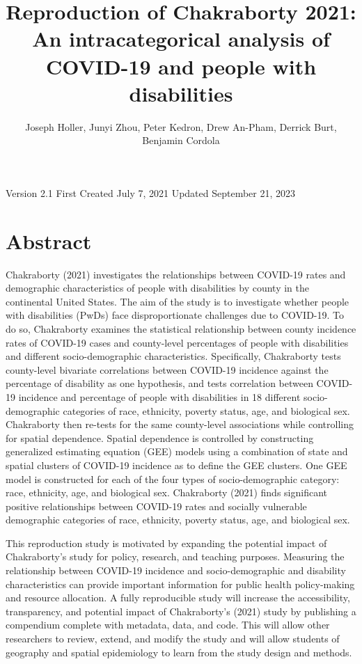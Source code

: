 \documentclass[
]{article}
\title{Reproduction of Chakraborty 2021: An intracategorical analysis of
COVID-19 and people with disabilities}
\author{Joseph Holler, Junyi Zhou, Peter Kedron, Drew An-Pham, Derrick
Burt, Benjamin Cordola}
\date{}
\begin{document}
\maketitle

Version 2.1 \textbar{} First Created July 7, 2021 \textbar{} Updated
September 21, 2023

\hypertarget{abstract}{%
\section{Abstract}\label{abstract}}

Chakraborty (2021) investigates the relationships between COVID-19 rates
and demographic characteristics of people with disabilities by county in
the continental United States. The aim of the study is to investigate
whether people with disabilities (PwDs) face disproportionate challenges
due to COVID-19. To do so, Chakraborty examines the statistical
relationship between county incidence rates of COVID-19 cases and
county-level percentages of people with disabilities and different
socio-demographic characteristics. Specifically, Chakraborty tests
county-level bivariate correlations between COVID-19 incidence against
the percentage of disability as one hypothesis, and tests correlation
between COVID-19 incidence and percentage of people with disabilities in
18 different socio-demographic categories of race, ethnicity, poverty
status, age, and biological sex. Chakraborty then re-tests for the same
county-level associations while controlling for spatial dependence.
Spatial dependence is controlled by constructing generalized estimating
equation (GEE) models using a combination of state and spatial clusters
of COVID-19 incidence as to define the GEE clusters. One GEE model is
constructed for each of the four types of socio-demographic category:
race, ethnicity, age, and biological sex. Chakraborty (2021) finds
significant positive relationships between COVID-19 rates and socially
vulnerable demographic categories of race, ethnicity, poverty status,
age, and biological sex.

This reproduction study is motivated by expanding the potential impact
of Chakraborty's study for policy, research, and teaching purposes.
Measuring the relationship between COVID-19 incidence and
socio-demographic and disability characteristics can provide important
information for public health policy-making and resource allocation. A
fully reproducible study will increase the accessibility, transparency,
and potential impact of Chakraborty's (2021) study by publishing a
compendium complete with metadata, data, and code. This will allow other
researchers to review, extend, and modify the study and will allow
students of geography and spatial epidemiology to learn from the study
design and methods.
\end{document}
